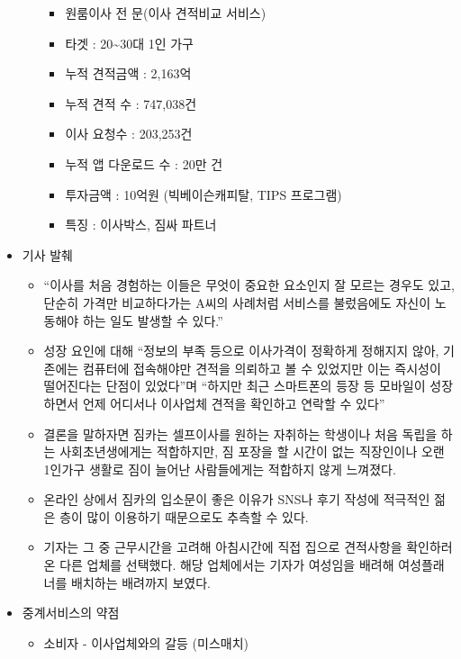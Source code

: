 \documentclass[11pt]{article}
\providecommand{\tightlist}{%
      \setlength{\itemsep}{0pt}\setlength{\parskip}{0pt}}
\begin{document}
\begin{itemize}
\begin{itemize}
    \begin{itemize}
    \tightlist
    \item
      원룸이사 전 문(이사 견적비교 서비스)
    \item
      타겟 : 20\textasciitilde{}30대 1인 가구
    \item
      누적 견적금액 : 2,163억
    \item
      누적 견적 수 : 747,038건
    \item
      이사 요청수 : 203,253건
    \item
      누적 앱 다운로드 수 : 20만 건
    \item
      투자금액 : 10억원 (빅베이슨캐피탈, TIPS 프로그램)
    \item
      특징 : 이사박스, 짐싸 파트너
    \end{itemize}
  \end{itemize}
\item
  기사 발췌

  \begin{itemize}
  \item
    ``이사를 처음 경험하는 이들은 무엇이 중요한 요소인지 잘 모르는
    경우도 있고, 단순히 가격만 비교하다가는 A씨의 사례처럼 서비스를
    불렀음에도 자신이 노동해야 하는 일도 발생할 수 있다.''
  \item
    성장 요인에 대해 ``정보의 부족 등으로 이사가격이 정확하게 정해지지
    않아, 기존에는 컴퓨터에 접속해야만 견적을 의뢰하고 볼 수 있었지만
    이는 즉시성이 떨어진다는 단점이 있었다''며 ``하지만 최근 스마트폰의
    등장 등 모바일이 성장하면서 언제 어디서나 이사업체 견적을 확인하고
    연락할 수 있다''
  \item
    결론을 말하자면 짐카는 셀프이사를 원하는 자취하는 학생이나 처음
    독립을 하는 사회초년생에게는 적합하지만, 짐 포장을 할 시간이 없는
    직장인이나 오랜 1인가구 생활로 짐이 늘어난 사람들에게는 적합하지
    않게 느껴졌다.
  \item
    온라인 상에서 짐카의 입소문이 좋은 이유가 SNS나 후기 작성에 적극적인
    젊은 층이 많이 이용하기 때문으로도 추측할 수 있다.
  \item
    기자는 그 중 근무시간을 고려해 아침시간에 직접 집으로 견적사항을
    확인하러온 다른 업체를 선택했다. 해당 업체에서는 기자가 여성임을
    배려해 여성플래너를 배치하는 배려까지 보였다.
  \end{itemize}
\item
  중계서비스의 약점

  \begin{itemize}
  \tightlist
  \item
    소비자 - 이사업체와의 갈등 (미스매치)
  \end{itemize}
\end{itemize}
\end{document}
